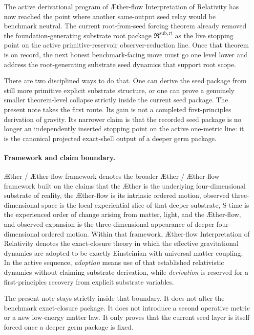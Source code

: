 \documentclass[11pt]{article}
\newcommand{\Aether}{\AE{}ther}
\newcommand{\Aflow}{\AE{}ther-flow}
\newcommand{\TheoryName}{\Aflow{} Interpretation of Relativity}
\newcommand{\TheoryProgram}{\Aether{} / \Aflow{} framework}
\newcommand{\RootPackage}{\mathfrak R^{\mathrm{sub,rt}}}
\begin{document}
The active derivational program of \TheoryName{} has now reached the point where another same-output seed relay would be benchmark neutral. The current root-from-seed forcing theorem already removed the foundation-generating substrate root package \(\RootPackage\) as the live stopping point on the active primitive-reservoir observer-reduction line. Once that theorem is on record, the next honest benchmark-facing move must go one level lower and address the root-generating substrate seed dynamics that support root scope.

There are two disciplined ways to do that. One can derive the seed package from still more primitive explicit substrate structure, or one can prove a genuinely smaller theorem-level collapse strictly inside the current seed package. The present note takes the first route. Its gain is not a completed first-principles derivation of gravity. Its narrower claim is that the recorded seed package is no longer an independently inserted stopping point on the active one-metric line: it is the canonical projected exact-shell output of a deeper germ package.

\paragraph{Framework and claim boundary.}
\TheoryProgram{} denotes the broader \Aether{} / \Aflow{} framework built on the claims that the \Aether{} is the underlying four-dimensional substrate of reality, the \Aflow{} is its intrinsic ordered motion, observed three-dimensional space is the local experiential slice of that deeper substrate, S-time is the experienced order of change arising from matter, light, and the \Aflow{}, and observed expansion is the three-dimensional appearance of deeper four-dimensional ordered motion. Within that framework, \TheoryName{} denotes the exact-closure theory in which the effective gravitational dynamics are adopted to be exactly Einsteinian with universal matter coupling. In the active sequence, \emph{adoption} means use of that established relativistic dynamics without claiming substrate derivation, while \emph{derivation} is reserved for a first-principles recovery from explicit substrate variables.

The present note stays strictly inside that boundary. It does not alter the benchmark exact-closure package. It does not introduce a second operative metric or a new low-energy matter law. It only proves that the current seed layer is itself forced once a deeper germ package is fixed.
\end{document}
